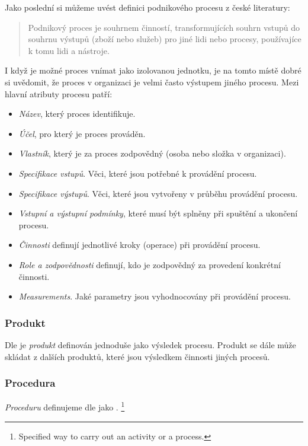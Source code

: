 Jako poslední si můžeme uvést definici podnikového procesu z české literatury: \cite{Repa2007}
\begin{quote}
Podnikový proces je souhrnem činností, transformujících souhrn vstupů do souhrnu výstupů (zboží nebo služeb) pro jiné lidi nebo procesy, používajíce k tomu lidi a nástroje.
\end{quote}

I když je možné proces vnímat jako izolovanou jednotku, je na tomto místě dobré si uvědomit, že proces v organizaci je velmi často výstupem jiného procesu. Mezi hlavní atributy procesu patří: \cite{Bandor2007}

\begin{itemize}
\item \textit{Název}, který proces identifikuje.
\item \textit{Účel}, pro který je proces prováděn.
\item \textit{Vlastník}, který je za proces zodpovědný (osoba nebo složka v organizaci).
\item \textit{Specifikace vstupů}. Věci, které jsou potřebné k provádění procesu.
\item \textit{Specifikace výstupů}. Věci, které jsou vytvořeny v průběhu provádění procesu.
\item \textit{Vstupní a výstupní podmínky}, které musí být splněny při spuštění a ukončení  procesu.
\item \textit{Činnosti} definují jednotlivé kroky (operace) při provádění procesu.
\item \textit{Role a zodpovědnosti} definují, kdo je zodpovědný za provedení konkrétní činnosti.
\item \textit{Measurements}. Jaké parametry jsou vyhodnocovány při provádění procesu.
\end{itemize}

\subsubsection{Produkt}
Dle \cite{iso_9000} je \textit{produkt} definován jednoduše jako výsledek procesu. Produkt se dále může skládat z dalších produktů, které jsou výsledkem činnosti jiných procesů.

\subsubsection{Procedura}
\textit{Proceduru} definujeme dle \cite{iso_9000} jako \textit{}.
\footnote{Specified way to carry out an activity or a process.\cite{iso_9000}}

